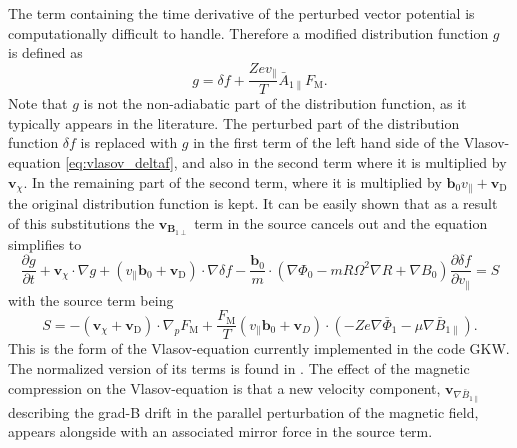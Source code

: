 \documentclass[a4paper,10pt]{article}
\newcommand{\st}[1]{\mathrm{#1}} %
\renewcommand{\vec}[1]{\mathbf{#1}}
\begin{document}
The term containing the time derivative of the perturbed vector potential is computationally difficult to handle. Therefore a modified distribution function $g$ is defined as
\begin{equation}
	g = \delta f + \frac{Z e v_{\parallel}}{T} \bar{A}_{1 \parallel} F_{\st{M}}.
	\label{eq:g}
\end{equation}
Note that $g$ is not the non-adiabatic part of the distribution function, as it typically appears in the literature. 
The perturbed part of the distribution function $\delta f$ is replaced with $g$ in the first term of the left hand side of the Vlasov-equation \ref{eq:vlasov_deltaf}, and also in the second term where it is multiplied by $\vec{v}_{\chi}$. In the remaining part of the second term, where it is multiplied by $\vec{b}_0 v_{\parallel} + \vec{v}_{\st{D}}$ the original distribution function is kept. It can be easily shown that as a result of this substitutions the $\vec{v}_{\vec{B}_{1 \perp}}$ term in the source cancels out and the equation simplifies to
\begin{equation}
	\frac{\partial g}{\partial t} + \vec{v}_{\chi} \cdot \nabla g + \left( v_{\parallel} \mathbf{b}_0 + \mathbf{v}_{\st{D}} \right) \cdot \nabla \delta f - \frac{\vec{b}_0}{m} \cdot \left(\nabla \Phi_0 - m R \Omega^2 \nabla R + \nabla B_0 \right) \frac{\partial \delta f}{\partial v_{\parallel}} = S 
	\label{eq:vlasov}
\end{equation}
with the source term being
\begin{equation}
	S = - \left( \mathbf{v}_{\chi} + \mathbf{v}_{\st{D}} \right) \cdot \nabla_p F_{\st{M}} + \frac{F_{\st{M}}}{T} \left( v_{\parallel} \mathbf{b}_0 + \mathbf{v}_{D} \right) \cdot \left( - Z e \nabla \bar{\Phi}_1 - \mu \nabla \bar{B}_{1 \parallel} \right).
	\label{eq:vlasov_source}
\end{equation}
This is the form of the Vlasov-equation currently implemented in the code GKW. The normalized version of its terms is found in \cite{gkw}. The effect of the magnetic compression on the Vlasov-equation is that a new velocity component, $\mathbf{v}_{\nabla \bar{B}_{1 \parallel}}$ describing the grad-B drift in the parallel perturbation of the magnetic field, appears alongside with an associated mirror force in the source term.



\end{document}

